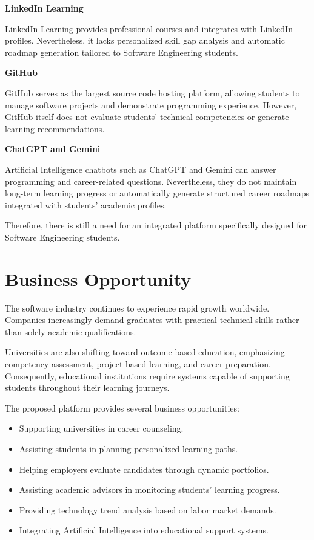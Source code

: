 \textbf{LinkedIn Learning} 

    LinkedIn Learning provides professional courses and integrates with LinkedIn profiles. Nevertheless, it lacks personalized skill gap analysis and automatic roadmap generation tailored to Software Engineering students. 

\textbf{GitHub} 

    GitHub serves as the largest source code hosting platform, allowing students to manage software projects and demonstrate programming experience. However, GitHub itself does not evaluate students' technical competencies or generate learning recommendations. 

\textbf{ChatGPT and Gemini} 

    Artificial Intelligence chatbots such as ChatGPT and Gemini can answer programming and career-related questions. Nevertheless, they do not maintain long-term learning progress or automatically generate structured career roadmaps integrated with students' academic profiles. 

    Therefore, there is still a need for an integrated platform specifically designed for Software Engineering students. 

\section{Business Opportunity}
The software industry continues to experience rapid growth worldwide. Companies increasingly demand graduates with practical technical skills rather than solely academic qualifications. 

Universities are also shifting toward outcome-based education, emphasizing competency assessment, project-based learning, and career preparation. Consequently, educational institutions require systems capable of supporting students throughout their learning journeys. 

The proposed platform provides several business opportunities: 

\begin{itemize}
    \item Supporting universities in career counseling.  
    \item Assisting students in planning personalized learning paths.  
    \item Helping employers evaluate candidates through dynamic portfolios.  
    \item Assisting academic advisors in monitoring students' learning progress.  
    \item Providing technology trend analysis based on labor market demands.  
    \item Integrating Artificial Intelligence into educational support systems.  
\end{itemize}

